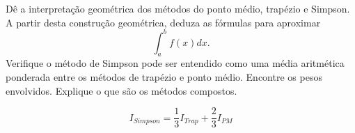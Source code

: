 %   

\begin{exer}
 Dê a interpretação geométrica dos métodos do ponto médio, trapézio e Simpson. A partir desta construção geométrica, deduza as fórmulas para aproximar 
 $$\int_a^bf(x)dx.$$
 Verifique o método de Simpson pode ser entendido como uma média aritmética ponderada entre os métodos de trapézio e ponto médio. Encontre os pesos envolvidos. Explique o que são os métodos compostos.
 \end{exer}
\begin{resp}
  
$$ I_{Simpson}= \frac{1}{3} I_{Trap}+ \frac{2}{3}I_{PM}$$    
  
\end{resp}


